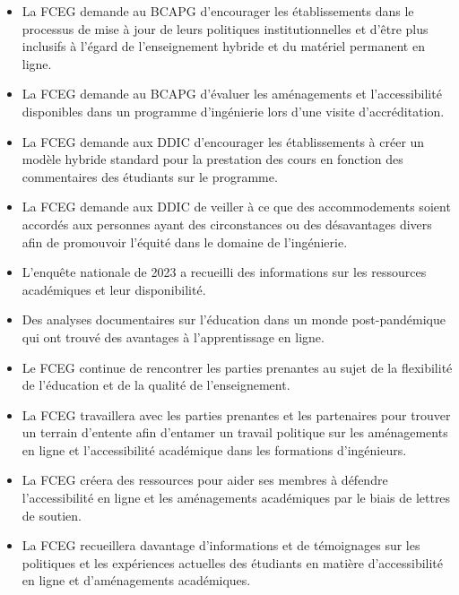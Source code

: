 \begin{itemize}
 \item La FCEG demande au BCAPG d'encourager les établissements dans le processus de mise à jour de leurs politiques institutionnelles et d'être plus inclusifs à l'égard de l'enseignement hybride et du matériel permanent en ligne.
 \item La FCEG demande au BCAPG d'évaluer les aménagements et l'accessibilité disponibles dans un programme d'ingénierie lors d'une visite d'accréditation.
 \item La FCEG demande aux DDIC d'encourager les établissements à créer un modèle hybride standard pour la prestation des cours en fonction des commentaires des étudiants sur le programme.
 \item La FCEG demande aux DDIC de veiller à ce que des accommodements soient accordés aux personnes ayant des circonstances ou des désavantages divers afin de promouvoir l'équité dans le domaine de l'ingénierie.
\end{itemize}

\begin{itemize}
 \item L'enquête nationale de 2023 a recueilli des informations sur les ressources académiques et leur disponibilité.
 \item Des analyses documentaires sur l'éducation dans un monde post-pandémique qui ont trouvé des avantages à l'apprentissage en ligne.
 \item Le FCEG continue de rencontrer les parties prenantes au sujet de la flexibilité de l'éducation et de la qualité de l'enseignement.
\end{itemize}

\begin{itemize}
 \item La FCEG travaillera avec les parties prenantes et les partenaires pour trouver un terrain d'entente afin d'entamer un travail politique sur les aménagements en ligne et l'accessibilité académique dans les formations d'ingénieurs.
 \item La FCEG créera des ressources pour aider ses membres à défendre l'accessibilité en ligne et les aménagements académiques par le biais de lettres de soutien.
 \item La FCEG recueillera davantage d'informations et de témoignages sur les politiques et les expériences actuelles des étudiants en matière d'accessibilité en ligne et d'aménagements académiques.
\end{itemize}

\newpage

